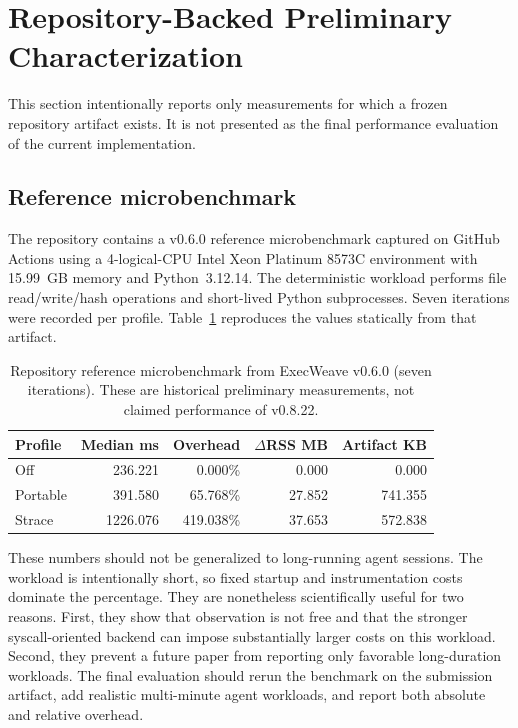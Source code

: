 \section{Repository-Backed Preliminary Characterization}
This section intentionally reports only measurements for which a frozen repository artifact exists. It is not presented as the final performance evaluation of the current implementation.

\subsection{Reference microbenchmark}
The repository contains a v0.6.0 reference microbenchmark captured on GitHub Actions using a 4-logical-CPU Intel Xeon Platinum 8573C environment with 15.99~GB memory and Python~3.12.14. The deterministic workload performs file read/write/hash operations and short-lived Python subprocesses. Seven iterations were recorded per profile. Table~\ref{tab:prelim} reproduces the values statically from that artifact.

\begin{table}[t]
\centering
\caption{Repository reference microbenchmark from ExecWeave v0.6.0 (seven iterations). These are historical preliminary measurements, not claimed performance of v0.8.22.}
\label{tab:prelim}
\footnotesize
\setlength{\tabcolsep}{3.5pt}
\begin{tabular}{lrrrr}
\toprule
Profile & Median ms & Overhead & $\Delta$RSS MB & Artifact KB \\
\midrule
Off & 236.221 & 0.000\% & 0.000 & 0.000 \\
Portable & 391.580 & 65.768\% & 27.852 & 741.355 \\
Strace & 1226.076 & 419.038\% & 37.653 & 572.838 \\
\bottomrule
\end{tabular}
\end{table}

These numbers should not be generalized to long-running agent sessions. The workload is intentionally short, so fixed startup and instrumentation costs dominate the percentage. They are nonetheless scientifically useful for two reasons. First, they show that observation is not free and that the stronger syscall-oriented backend can impose substantially larger costs on this workload. Second, they prevent a future paper from reporting only favorable long-duration workloads. The final evaluation should rerun the benchmark on the submission artifact, add realistic multi-minute agent workloads, and report both absolute and relative overhead.

